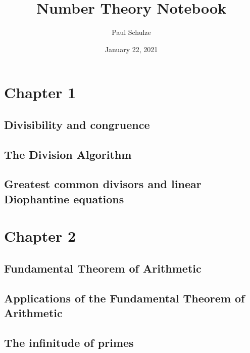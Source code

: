 \documentclass{article}
\title{Number Theory Notebook}
\author{Paul Schulze}
\date{January 22, 2021}
\numberwithin{equation}{thm}
\begin{document}
\maketitle



\section{Chapter 1}

\subsection*{Divisibility and congruence}




\subsection*{The Division Algorithm}




\subsection*{Greatest common divisors and linear Diophantine equations}





\pagebreak



\section{Chapter 2}

\subsection*{Fundamental Theorem of Arithmetic}




\subsection*{Applications of the Fundamental Theorem of Arithmetic}




\subsection*{The infinitude of primes}
\end{document}
